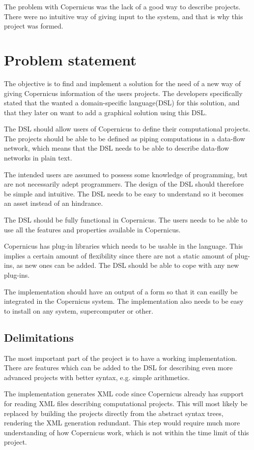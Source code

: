 The problem with Copernicus was the lack of a good way to describe
projects. There were no intuitive way of giving input to the system,
and that is why this project was formed.


\section{Problem statement}
The objective is to find and implement a solution for the need of a
new way of giving Copernicus information of the users projects. The
developers specifically stated that the wanted a domain-specific
language(DSL) for this solution, and that they later on want to add a
graphical solution using this DSL.

The DSL should allow users of Copernicus to define their computational
projects. The projects should be able to be defined as piping
computations in a data-flow network, which means that the DSL needs to
be able to describe data-flow networks in plain text.

The intended users are assumed to possess some knowledge of
programming, but are not necessarily adept programmers. The design of
the DSL should therefore be simple and intuitive. The DSL needs to be
easy to understand so it becomes an asset instead of an hindrance.

The DSL should be fully functional in Copernicus. The users needs to
be able to use all the features and properties available in
Copernicus.

Copernicus has plug-in libraries which needs to be usable in the
language. This implies a certain amount of flexibility since there are
not a static amount of plug-ins, as new ones can be added. The DSL
should be able to cope with any new plug-ins.

The implementation should have an output of a form so that it can
easilly be integrated in the Copernicus system. The implementation
also needs to be easy to install on any system, supercomputer or
other.

\subsection{Delimitations}
The most important part of the project is to have a working
implementation. There are features which can be added to the DSL for
describing even more advanced projects with better syntax, e.g. simple
arithmetics.

The implementation generates XML code since Copernicus already has
support for reading XML files describing computational projects. This
will most likely be replaced by building the projects directly from
the abstract syntax trees, rendering the XML generation
redundant. This step would require much more understanding of how
Copernicus work, which is not within the time limit of this project.

